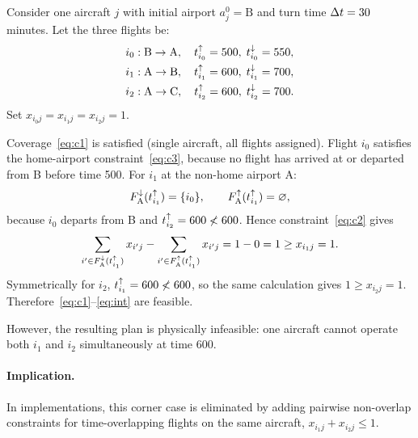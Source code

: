 \begin{example}
  \label{ex:simultaneous_departure_counterexample}
  Consider one aircraft $j$ with initial airport $a^0_j=\text{B}$ and
  turn time $\Delta t=30$ minutes. Let the three flights be:
  \begin{align*}
    &i_0: \text{B}\to\text{A},\quad t^{\uparrow}_{i_0}=500,\;t^{\downarrow}_{i_0}=550,\\
    &i_1: \text{A}\to\text{B},\quad t^{\uparrow}_{i_1}=600,\;t^{\downarrow}_{i_1}=700,\\
    &i_2: \text{A}\to\text{C},\quad t^{\uparrow}_{i_2}=600,\;t^{\downarrow}_{i_2}=700.
  \end{align*}
  Set $x_{i_0j}=x_{i_1j}=x_{i_2j}=1$.

  Coverage~\eqref{eq:c1} is satisfied (single aircraft, all flights assigned).
  Flight $i_0$ satisfies the home-airport constraint~\eqref{eq:c3}, because
  no flight has arrived at or departed from B before time 500. For $i_1$ at
  the non-home airport A:
  \begin{equation*}
    F^{\downarrow}_{\text{A}}(t^{\uparrow}_{i_1})=\{i_0\},\qquad
    F^{\uparrow}_{\text{A}}(t^{\uparrow}_{i_1})=\varnothing,
  \end{equation*}
  because $i_0$ departs from B and $t^{\uparrow}_{i_2}=600\not<600$. Hence
  constraint~\eqref{eq:c2} gives
  \begin{equation*}
    \sum_{i'\in F^{\downarrow}_{\text{A}}(t^{\uparrow}_{i_1})}x_{i'j}
    -\sum_{i'\in F^{\uparrow}_{\text{A}}(t^{\uparrow}_{i_1})}x_{i'j}
    =1-0=1
    \ge x_{i_1j}=1.
  \end{equation*}
  Symmetrically for $i_2$, $t^{\uparrow}_{i_1}=600\not<600$, so the same calculation gives
  $1\ge x_{i_2j}=1$. Therefore~\eqref{eq:c1}--\eqref{eq:int} are feasible.

  However, the resulting plan is physically infeasible: one aircraft cannot
  operate both $i_1$ and $i_2$ simultaneously at time 600.
\end{example}

\paragraph{Implication.}
In implementations, this corner case is eliminated by adding pairwise
non-overlap constraints for time-overlapping flights on the same aircraft,
$x_{i_1j}+x_{i_2j}\le 1$.

